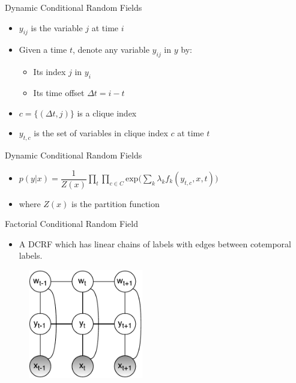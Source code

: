 \documentclass[presentation,bigger]{beamer}
\begin{document}
\begin{frame}[label={sec:orgheadline11}]{Dynamic Conditional Random Fields}
\begin{itemize}
\item \(y_{ij}\) is the variable \(j\) at time \(i\)
\end{itemize}
\begin{definition}
\begin{itemize}
\item Given a time \(t\), denote any variable \(y_{ij}\) in \(y\) by:
\begin{itemize}
\item Its index \(j\) in \(y_i\)
\item Its time offset \(\Delta t = i-t\)
\end{itemize}
\item \(c = \{(\Delta t, j)\}\) is a clique index
\item \(y_{t,c}\) is the set of variables in clique index \(c\) at time \(t\)
\end{itemize}
\end{definition}
\end{frame}
\begin{frame}[label={sec:orgheadline12}]{Dynamic Conditional Random Fields}
\begin{definition}
\begin{itemize}
\item \(p(y|x) = \dfrac{1}{Z(x)}\displaystyle \prod_{t}\prod_{c \in C} \text{exp}\Bigg(\sum_k \lambda_k f_k(y_{t,c},x,t)\Bigg)\)
\item where \(Z(x)\) is the partition function
\end{itemize}
\end{definition}
\end{frame}
\begin{frame}[label={sec:orgheadline13}]{Factorial Conditional Random Field}
\begin{itemize}
\item A DCRF which has linear chains of labels with edges between cotemporal labels.
\end{itemize}
\begin{figure}[htb]
\centering
\includegraphics[width=5cm]{figures/FCRF.pdf}
\end{figure}
\end{frame}
\end{document}
